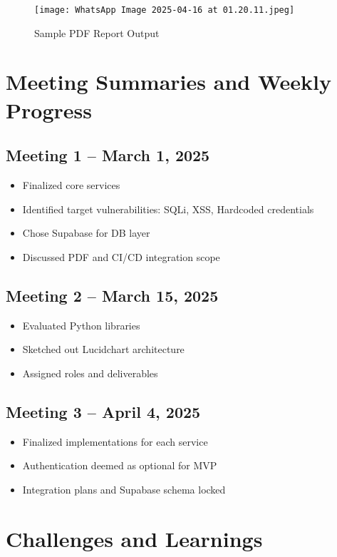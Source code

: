\documentclass{article}
\begin{document}
\begin{figure}[h!]
\centering
\texttt{[image: WhatsApp Image 2025-04-16 at 01.20.11.jpeg]}
\caption{Sample PDF Report Output}
\end{figure}

\section{Meeting Summaries and Weekly Progress}
\subsection{Meeting 1 – March 1, 2025}
\begin{itemize}
    \item Finalized core services
    \item Identified target vulnerabilities: SQLi, XSS, Hardcoded credentials
    \item Chose Supabase for DB layer
    \item Discussed PDF and CI/CD integration scope
\end{itemize}

\subsection{Meeting 2 – March 15, 2025}
\begin{itemize}
    \item Evaluated Python libraries
    \item Sketched out Lucidchart architecture
    \item Assigned roles and deliverables
\end{itemize}

\subsection{Meeting 3 – April 4, 2025}
\begin{itemize}
    \item Finalized implementations for each service
    \item Authentication deemed as optional for MVP
    \item Integration plans and Supabase schema locked
\end{itemize}

\section{Challenges and Learnings}
\end{document}
